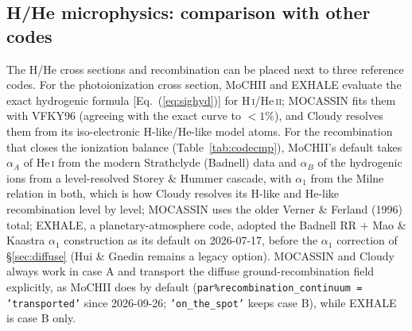 \documentclass[english,a4paper]{my_memo}
\newcommand{\code}[1]{\texttt{#1}}
\begin{document}
\subsection{H/He microphysics: comparison with other codes}
\label{sec:codecmp}
The H/He cross sections and recombination can be placed next to three
reference codes.  For the photoionization cross section, MoCHII and
EXHALE evaluate the exact hydrogenic formula [Eq.~(\ref{eq:sighyd})] for
H\,\textsc{i}/He\,\textsc{ii}; MOCASSIN fits them with VFKY96 (agreeing
with the exact curve to $<1\%$), and Cloudy resolves them from its
iso-electronic H-like/He-like model atoms.  For the recombination that
closes the ionization balance (Table~\ref{tab:codecmp}), MoCHII's default
takes $\alpha_A$ of He\,\textsc{i} from the modern Strathclyde (Badnell)
data and $\alpha_B$ of the hydrogenic ions from a level-resolved Storey \&
Hummer cascade, with $\alpha_1$ from the Milne relation in both, which is
how Cloudy resolves its H-like and He-like recombination level by level; MOCASSIN uses the
older Verner \& Ferland (1996) total; EXHALE, a planetary-atmosphere
code, adopted the Badnell RR $+$ Mao \& Kaastra $\alpha_1$ construction as
its default on 2026-07-17, before the $\alpha_1$ correction of
\S\ref{sec:diffuse} (Hui \& Gnedin remains a legacy option).  MOCASSIN
and Cloudy always work in
case A and transport the diffuse ground-recombination field explicitly,
as MoCHII does by default (\code{par\%recombination\_continuum =
'transported'} since 2026-09-26; \code{'on\_the\_spot'} keeps case B),
while EXHALE is case B only.
\end{document}
